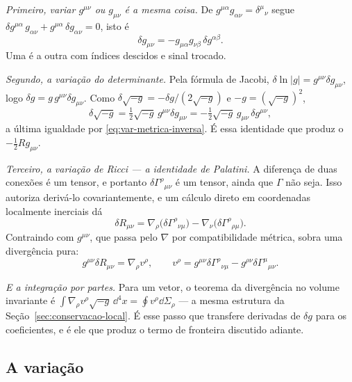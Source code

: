 \documentclass[12pt,a4paper,oneside]{book}
\theoremstyle{rgplain}
\theoremstyle{rgremark}
\begin{document}
\emph{Primeiro, variar $g^{\mu\nu}$ ou $g_{\mu\nu}$ é a mesma coisa.} De
$g^{\mu\alpha}g_{\alpha\nu}=\delta^\mu{}_\nu$ segue
$\delta g^{\mu\alpha}\,g_{\alpha\nu}+g^{\mu\alpha}\,\delta g_{\alpha\nu}=0$,
isto é
\begin{equation}
  \delta g_{\mu\nu}=-g_{\mu\alpha}g_{\nu\beta}\,\delta g^{\alpha\beta} .
  \label{eq:var-metrica-inversa}
\end{equation}
Uma é a outra com índices descidos e sinal trocado.

\emph{Segundo, a variação do determinante.} Pela fórmula de Jacobi,
$\delta\ln|g|=g^{\mu\nu}\delta g_{\mu\nu}$, logo
$\delta g=g\,g^{\mu\nu}\delta g_{\mu\nu}$. Como
$\delta\sqrt{-g}=-\delta g/(2\sqrt{-g})$ e $-g=(\sqrt{-g})^2$,
\[
  \delta\sqrt{-g}=\tfrac12\sqrt{-g}\,g^{\mu\nu}\delta g_{\mu\nu}
  =-\tfrac12\sqrt{-g}\,g_{\mu\nu}\,\delta g^{\mu\nu} ,
\]
a última igualdade por \eqref{eq:var-metrica-inversa}. É essa identidade que
produz o $-\tfrac12 Rg_{\mu\nu}$.

\emph{Terceiro, a variação de Ricci --- a identidade de Palatini.} A diferença
de duas conexões é um tensor, e portanto $\delta\Gamma^\rho{}_{\mu\nu}$ é um
tensor, ainda que $\Gamma$ não seja. Isso autoriza derivá-lo covariantemente,
e um cálculo direto em coordenadas localmente inerciais dá
\begin{equation}
  \delta R_{\mu\nu}
  =\nabla_\rho\bigl(\delta\Gamma^\rho{}_{\nu\mu}\bigr)
  -\nabla_\nu\bigl(\delta\Gamma^\rho{}_{\rho\mu}\bigr) .
  \label{eq:palatini}
\end{equation}
Contraindo com $g^{\mu\nu}$, que passa pelo $\nabla$ por compatibilidade
métrica, sobra uma divergência pura:
\begin{equation}
  g^{\mu\nu}\delta R_{\mu\nu}=\nabla_\rho v^\rho ,
  \qquad
  v^\rho=g^{\mu\nu}\delta\Gamma^\rho{}_{\nu\mu}
  -g^{\rho\nu}\delta\Gamma^\mu{}_{\mu\nu} .
  \label{eq:divergencia-palatini}
\end{equation}

\emph{E a integração por partes.} Para um vetor, o teorema da divergência no
volume invariante é
$\int\nabla_\rho v^\rho\sqrt{-g}\,\dd^4x=\oint v^\rho\dd\Sigma_\rho$ --- a
mesma estrutura da Seção~\ref{sec:conservacao-local}. É esse passo que
transfere derivadas de $\delta g$ para os coeficientes, e é ele que produz o
termo de fronteira discutido adiante.

\subsection*{A variação}
\end{document}
